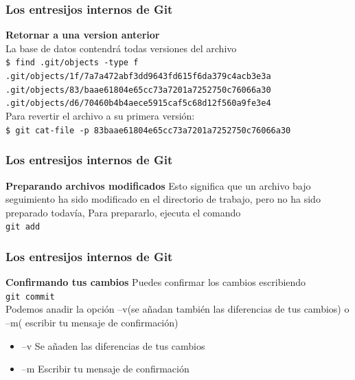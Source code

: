\documentclass{beamer}
\begin{document}
	\begin{frame}
		\frametitle{Los entresijos internos de Git}
		\textbf{Retornar a una version anterior}\\
		La base de datos contendrá todas versiones del archivo
		\\
		{\tt\scriptsize \$ find .git/objects -type f 
.git/objects/1f/7a7a472abf3dd9643fd615f6da379c4acb3e3a
.git/objects/83/baae61804e65cc73a7201a7252750c76066a30
.git/objects/d6/70460b4b4aece5915caf5c68d12f560a9fe3e4}
		\\		
		Para revertir el archivo a su primera versión:\\
		{\tt\scriptsize \$ git cat-file -p 83baae61804e65cc73a7201a7252750c76066a30}
	\end{frame}
	\begin{frame}
		\frametitle{Los entresijos internos de Git}
		\textbf{Preparando archivos modificados}
		Esto significa que un archivo bajo seguimiento ha sido modificado en el directorio de trabajo, pero no ha sido preparado todavía, Para prepararlo, ejecuta el comando \\
		{\tt git add}\\
	\end{frame}
	\begin{frame}
		\frametitle{Los entresijos internos de Git}
		\textbf{Confirmando tus cambios}
		Puedes confirmar los cambios escribiendo \\
		{\tt git commit}\\
		Podemos anadir la opción –v(se añadan también las diferencias de tus cambios) o –m( escribir tu mensaje de confirmación)
		\begin{itemize}
			\item –v Se añaden las diferencias de tus cambios
			\item –m Escribir tu mensaje de confirmación
		\end{itemize}
	\end{frame}
	
\end{document}
